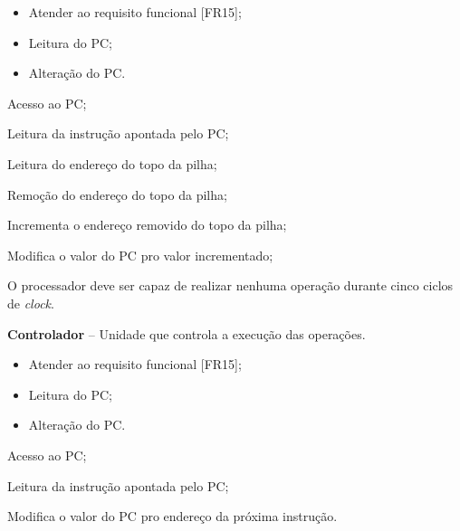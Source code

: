 \documentclass{article}
\begin{document}
  \preconditions 
  \begin{itemize}
  	\item Atender ao requisito funcional [FR15];
  	\item Leitura do PC;
  \end{itemize}
  
  \postconditions
  \begin{itemize}
  	\item Alteração do PC.
  \end{itemize}
  
  
  \begin{mainflow}
  	\item Acesso ao PC;
  	\item Leitura da instrução apontada pelo PC;
  	\item Leitura do endereço do topo da pilha;
  	\item Remoção do endereço do topo da pilha;
  	\item Incrementa o endereço removido do topo da pilha;
  	\item Modifica o valor do PC pro valor incrementado;
  \end{mainflow}
  
  O processador deve ser capaz de realizar nenhuma operação durante cinco ciclos de \textit{clock}.
  \actors
  \begin{description}
  	\item \textbf{Controlador} – Unidade que controla a execução das operações.
  \end{description}
  
  \preconditions 
  \begin{itemize}
  	\item Atender ao requisito funcional [FR15];
  	\item Leitura do PC;
  \end{itemize}
  
  \postconditions
  \begin{itemize}
  	\item Alteração do PC.
  \end{itemize}
  
  
  \begin{mainflow}
  	\item Acesso ao PC;
  	\item Leitura da instrução apontada pelo PC;
  	\item Modifica o valor do PC pro endereço da próxima instrução.
  \end{mainflow} 

% 
% 
\end{document}
